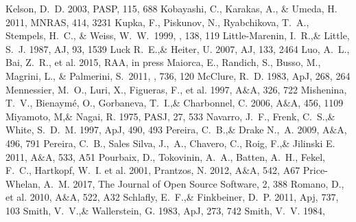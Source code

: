 \documentclass[a4paper,fleqn,usenatbib]{mnras}
\begin{document}
\begin{thebibliography}{99}
Kelson, D.~D. 2003, 
PASP, 115, 688
Kobayashi, C., Karakas, A., \& Umeda, H. 2011, 
MNRAS, 414, 3231
 Kupka, F., Piskunov, N., Ryabchikova, T.~A., Stempels, H.~C., \& Weiss, W.~W.\ 1999, \aaps, 138, 119 
Little-Marenin, I.~R.,\& Little, S.~J. 1987, 
AJ, 93, 1539
Luck R.~E.,\& Heiter, U. 2007, 
AJ, 133, 2464
Luo, A.~L., Bai, Z.~R., et al. 2015, 
RAA, in press
 Maiorca, E., Randich, S., Busso, M., Magrini, L., \& Palmerini, S.\ 2011, \apj, 736, 120 
McClure, R.~D. 1983, 
ApJ, 268, 264
Mennessier, M.~O., Luri, X., Figueras, F., et al. 1997, 
A$\&$A, 326, 722
Mishenina, T.~V., Bienaym\' e, O., Gorbaneva, T.~I.,\& Charbonnel, C. 2006, 
A$\&$A, 456, 1109
Miyamoto, M,\& Nagai, R. 1975, 
PASJ, 27, 533
Navarro, J.~F., Frenk, C.~S.,\& White, S.~D.~M. 1997, 
ApJ, 490, 493
Pereira, C.~B.,\& Drake N.,~A. 2009, 
A$\&$A, 496, 791
Pereira, C.~B., Sales Silva, J.,~A., Chavero, C., Roig, F.,\& Jilinski E. 2011, 
A$\&$A, 533, A51
Pourbaix, D., Tokovinin, A.~A., Batten, A.~H., Fekel, F.~C., Hartkopf, W.~I. et al. 2001, 
Prantzos, N. 2012, 
A$\&$A, 542, A67
Price-Whelan, A.~M. 2017, 
The Journal of Open Source Software, 2, 388
Romano, D., et al. 2010, 
A$\&$A, 522, A32
Schlafly, E.~F.,\& Finkbeiner, D.~P. 2011, 
Apj, 737, 103
Smith, V.~V.,\& Wallerstein, G. 1983, 
ApJ, 273, 742
Smith, V.~V. 1984, 

\end{thebibliography}
\end{document}
